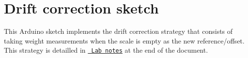 \chapter{Drift correction sketch}
\hypertarget{md__sketch_examples_2_weight_reading_with_recalibration_sketch_2_r_e_a_d_m_e}{}\label{md__sketch_examples_2_weight_reading_with_recalibration_sketch_2_r_e_a_d_m_e}
\label{md__sketch_examples_2_weight_reading_with_recalibration_sketch_2_r_e_a_d_m_e_autotoc_md1}%
%
 This Arduino sketch implements the drift correction strategy that consists of taking weight measurements when the scale is empty as the new reference/offset. This strategy is detailled in \href{https://www.overleaf.com/read/vvxvjbdjmgmg}{\texttt{ Lab notes}} at the end of the document. 